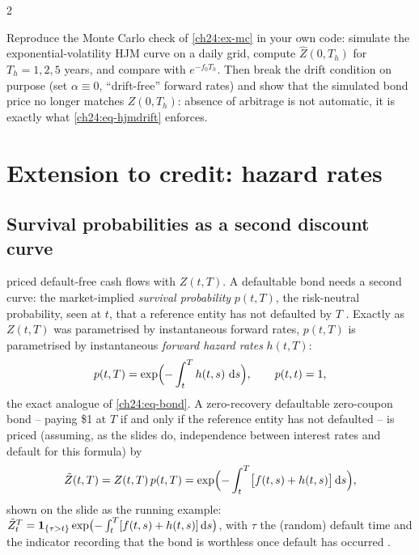 \begin{paracol}{2}
\begin{exercise}\label{ch24:ex-mccode}
Reproduce the Monte Carlo check of \cref{ch24:ex-mc} in your own code: simulate the exponential-volatility HJM curve on a daily grid, compute $\hat Z(0,T_h)$ for $T_h=1,2,5$ years, and compare with $e^{-f_0T_h}$. Then break the drift condition on purpose (set $\alpha\equiv0$, ``drift-free'' forward rates) and show that the simulated bond price no longer matches $Z(0,T_h)$: absence of arbitrage is not automatic, it is exactly what \eqref{ch24:eq-hjmdrift} enforces.
\end{exercise}

\section{Extension to credit: hazard rates}\label{ch24:sec-credit}

\subsection{Survival probabilities as a second discount curve}
 priced default-free cash flows with $Z(t,T)$. A defaultable bond needs a second curve: the market-implied \emph{survival probability} $p(t,T)$, the risk-neutral probability, seen at $t$, that a reference entity has not defaulted by $T$ . Exactly as $Z(t,T)$ was parametrised by instantaneous forward rates, $p(t,T)$ is parametrised by instantaneous \emph{forward hazard rates} $h(t,T)$:
\begin{equation}\label{ch24:eq-survival}
  p(t,T)=\exp\Bigl(-\int_t^Th(t,s)\,\,\mathrm{d} s\Bigr),\qquad p(t,t)=1,
\end{equation}
the exact analogue of \eqref{ch24:eq-bond}. A zero-recovery defaultable zero-coupon bond -- paying \$1 at $T$ if and only if the reference entity has not defaulted -- is priced (assuming, as the slides do, independence between interest rates and default for this formula) by
\begin{equation}\label{ch24:eq-defbond}
  \tilde Z(t,T)=Z(t,T)\,p(t,T)=\exp\Bigl(-\int_t^T\bigl[f(t,s)+h(t,s)\bigr]\,\mathrm{d} s\Bigr) ,
\end{equation}
 shown on the slide as the running example: $\tilde Z_t^T=\mathbf{1}_{\{\tau>t\}}\exp\bigl(-\int_t^T[f(t,s)+h(t,s)]\,\mathrm{d} s\bigr)$, with $\tau$ the (random) default time and the indicator recording that the bond is worthless once default has occurred .


\end{paracol}
